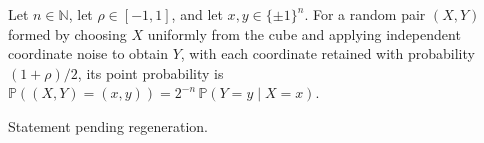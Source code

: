 \begin{theorem}
\label{FABL.correlatedPairPMF_apply}
\leanok
{}
Let $n\in\mathbb N$, let $\rho\in[-1,1]$, and let $x,y\in\{\pm1\}^n$. For a random pair
$(X,Y)$ formed by choosing $X$ uniformly from the cube and applying independent
coordinate noise to obtain $Y$, with each coordinate retained with probability
$(1+\rho)/2$, its point probability is $\mathbb P((X,Y)=(x,y))=2^{-n}\,\mathbb P(Y=y\mid
X=x)$.
\end{theorem}

\begin{theorem}
\label{FABL.correlatedPairPMF_apply_swap}
\leanok
{}
Statement pending regeneration.
\end{theorem}

